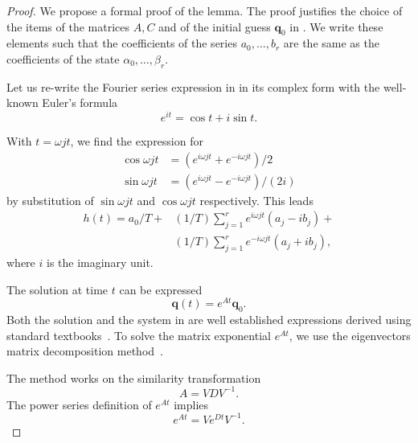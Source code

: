 \begin{proof}
We propose a formal proof of the lemma. The proof justifies the choice of the items of the matrices $A,C$ and of the initial guess $\mathbf{q}_0$ in . We write these elements such that the coefficients of the series $a_0,\dots,b_r$ are the same as the coefficients of the state $\alpha_0,\dots,\beta_r$.

Let us re-write the Fourier series expression in  in its complex form with the well-known Euler's formula 
\begin{equation}
  e^{it}=\cos{t}+i\sin{t}.
\end{equation} 

With $t=\omega jt$, we find the expression for 
\begin{subequations}\begin{align}
  \cos{\omega jt}&=(e^{i\omega jt}+e^{-i\omega jt})/2\\  
  \sin{\omega jt}&=(e^{i\omega jt}-e^{-i\omega jt})/(2i)
\end{align}\end{subequations}
by substitution of $\sin{\omega jt}$ and $\cos{\omega jt}$ respectively. This leads~\cite{kuo1967automatic}
\begin{equation}\begin{split}\label{eq:proof-complex}
  h(t)=a_0/T+&(1/T)\sum_{j=1}^{r}{e^{i\omega jt}(a_j-ib_j)}+\\&(1/T)\sum_{j=1}^{r}{e^{-i\omega jt}(a_j+ib_j)},
 \end{split}\end{equation}
where $i$ is the imaginary unit. 

The solution at time $t$ can be expressed
\begin{equation}
  \mathbf{q}(t)=e^{At}\mathbf{q}_0.
\end{equation}
Both the solution and the system in  are well established expressions derived using standard textbooks~\cite{kuo1967automatic, ogata2002modern}. To solve the matrix exponential $e^{At}$, we use the eigenvectors matrix decomposition method~\cite{moler2003nineteen}.

The method works on the similarity transformation 
\begin{equation}
  A=VDV^{-1}.
\end{equation}
The power series definition of $e^{At}$ implies~\cite{moler2003nineteen}
\begin{equation}
  e^{At}=Ve^{Dt}V^{-1}.
\end{equation} 


\end{proof}
